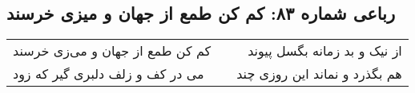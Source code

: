 \begin{center}
\section*{رباعی شماره ۸۳: کم کن طمع از جهان و میزی خرسند}
\label{sec:sh083}
\begin{longtable}{l p{0.5cm} r}
کم کن طمع از جهان و می‌زی خرسند
&&
از نیک و بد زمانه بگسل پیوند
\\
می در کف و زلف دلبری گیر که زود
&&
هم بگذرد و نماند این روزی چند
\\
\end{longtable}
\end{center}
